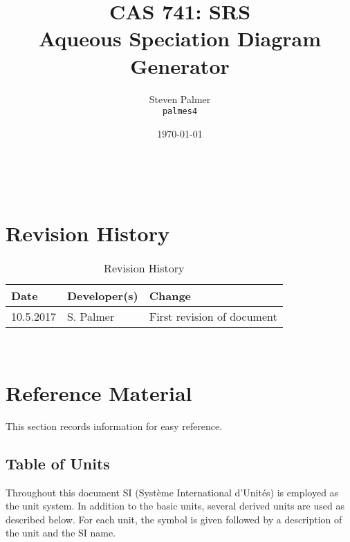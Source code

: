 \documentclass[12pt]{article}
\begin{document}

\title{CAS 741: SRS\\[10pt]\Large Aqueous Speciation Diagram Generator}
\author{Steven Palmer\\\texttt{palmes4}}
\date{\today}
	
\maketitle

~\newpage


\setcounter{secnumdepth}{0}

\section{Revision History}

\begin{table}[hp]
\caption{Revision History} \label{TblRevisionHistory}
\begin{tabularx}{\textwidth}{llX}
\toprule
\textbf{Date} & \textbf{Developer(s)} & \textbf{Change}\\
\midrule
10.5.2017 & S. Palmer & First revision of document\\
\bottomrule
\end{tabularx}
\end{table}

~\newpage

\section{Reference Material}

This section records information for easy reference.

\subsection{Table of Units}

Throughout this document SI (Syst\`{e}me International d'Unit\'{e}s) is employed
as the unit system.  In addition to the basic units, several derived units are
used as described below.  For each unit, the symbol is given followed by a
description of the unit and the SI name.
~\newline
\end{document}
